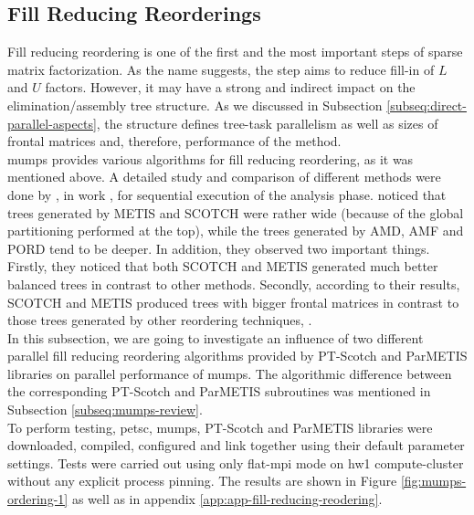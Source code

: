 \subsection{Fill Reducing Reorderings}
\label{subseq:fill-in-reordering}

Fill reducing reordering is one of the first and the most important steps of sparse matrix factorization. As the name suggests, the step aims to reduce fill-in of $L$ and $U$ factors. However, it may have a strong and indirect impact on the elimination/assembly tree structure. As we discussed in Subsection \ref{subseq:direct-parallel-aspects}, the structure defines tree-task parallelism as well as sizes of frontal matrices and, therefore, performance of the method.\\


\acrshort{mumps} provides various algorithms for fill reducing reordering, as it was mentioned above. A detailed study and comparison of different methods were done by \citeauthor{guermouche2003memory}, in work \cite{guermouche2003memory}, for sequential execution of the analysis phase. \citeauthor{guermouche2003memory} noticed that  trees generated by METIS and SCOTCH were rather wide (because of the global partitioning performed at the top), while the trees generated by AMD, AMF and PORD tend to be deeper. In addition, they observed two important things. Firstly, they noticed that both SCOTCH and METIS generated much better balanced trees in contrast to other methods. Secondly, according to their results, SCOTCH and METIS produced trees with bigger frontal matrices in contrast to those trees generated by other reordering techniques, \cite{guermouche2003memory}.\\


In this subsection, we are going to investigate an influence of two different parallel fill reducing reordering algorithms provided by PT-Scotch and ParMETIS libraries on parallel performance of \acrshort{mumps}. The algorithmic difference between the corresponding PT-Scotch and ParMETIS subroutines was mentioned in Subsection \ref{subseq:mumps-review}.\\


To perform testing, \acrshort{petsc}, \acrshort{mumps}, PT-Scotch and ParMETIS libraries were downloaded, compiled, configured and link together using their default parameter settings. Tests were carried out using only flat-\acrshort{mpi} mode on \gls{hw1} compute-cluster without any explicit process pinning. The results are shown in Figure \ref{fig:mumps-ordering-1} as well as in appendix \ref{app:app-fill-reducing-reodering}.\\


